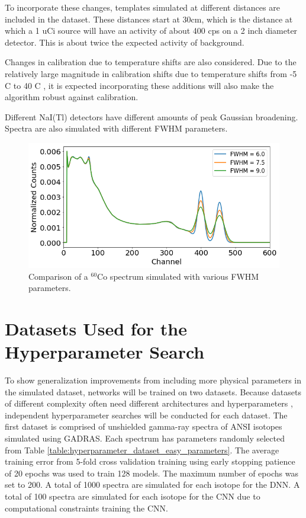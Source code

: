 To incorporate these changes, templates simulated at different distances are included in the dataset. These distances start at 30cm, which is the distance at which a 1 uCi source will have an activity of about 400 cps on a 2 inch diameter detector. This is about twice the expected activity of background. 

Changes in calibration due to temperature shifts are also considered. Due to the relatively large magnitude in calibration shifts due to temperature shifts from -5 C to 40 C \cite{CASANOVAS2012588}, it is expected incorporating these additions will also make the algorithm robust against calibration.

Different NaI(Tl) detectors have different amounts of peak Gaussian broadening. Spectra are also simulated with different FWHM parameters.


\begin{figure}[H]
\centering
\includegraphics[width=0.95\linewidth]{images/sim_spectra_FWHM_comparison}
\caption{Comparison of a $^{60}$Co spectrum simulated with various FWHM parameters.}
\label{fig:sim_spectra_FWHM_comparison}
\end{figure}


\section{Datasets Used for the Hyperparameter Search}

To show generalization improvements from including more physical parameters in the simulated dataset, networks will be trained on two datasets. Because datasets of different complexity often need different architectures and hyperparameters \cite{Bergstra2012}, independent hyperparameter searches will be conducted for each dataset. The first dataset is comprised of unshielded gamma-ray spectra of ANSI isotopes simulated using GADRAS. Each spectrum has parameters randomly selected from Table \ref{table:hyperparameter_dataset_easy_parameters}. The average training error from 5-fold cross validation training using early stopping patience of 20 epochs was used to train 128 models. The maximum number of epochs was set to 200. A total of 1000 spectra are simulated for each isotope for the DNN. A total of 100 spectra are simulated for each isotope for the CNN due to computational constraints training the CNN.


